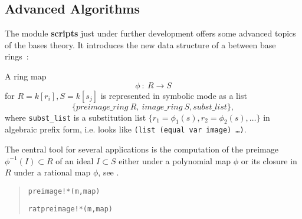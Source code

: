 \subsection{Advanced Algorithms}

The module {\bf scripts} just under further development offers some
advanced topics of the \gr bases theory. It introduces the new data
structure of a  between base rings~:
\medskip

A ring map 
\[ \phi\ :\ R\longrightarrow S\]
for $R=k[r_i], S=k[s_j]$ is represented in symbolic mode as a list
\[   \{preimage\_ring\ R,\ image\_ring\ S, subst\_list\},\]
where {\tt subst\_list} is a substitution list $\{r_1=\phi_1(s),
r_2=\phi_2(s),\ldots \}$ in algebraic prefix form, i.e. looks like
{\tt (list (equal var image) \ldots )}. 

The central tool for several applications is the computation of the
preimage $\phi^{-1}(I)\subset R$ of an ideal $I\subset S$ either
under a polynomial map $\phi$ or its closure in $R$ under a rational
map $\phi$, see \cite[7.69 and 7.71]{BKW}.
\begin{quote}
\verb|preimage!*(m,map)| 


\verb|ratpreimage!*(m,map)| 


\end{quote}

